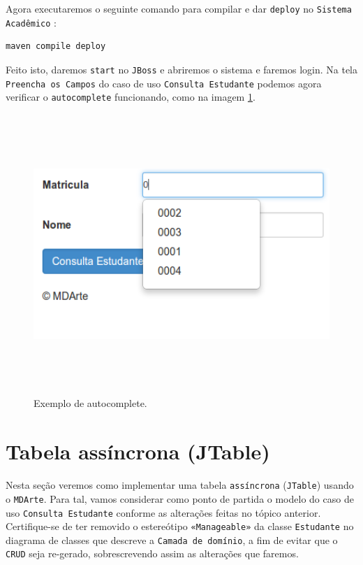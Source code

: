 \begin{framed}

\end{framed}

Agora executaremos o seguinte comando para compilar e dar \texttt{deploy} no
\texttt{Sistema Acadêmico} :
\begin{lstlisting}[language=bash]
maven compile deploy
\end{lstlisting}

Feito isto, daremos \texttt{start} no \texttt{JBoss} e abriremos o sistema e
faremos login. Na tela \texttt{Preencha os Campos} do caso de uso
\texttt{Consulta Estudante} podemos agora verificar o \texttt{autocomplete}
funcionando, como na imagem \ref{exemplo_autocomplete}.
\begin{figure}[H]
	\centering
	\includegraphics[width=350pt,height=300pt]{files/imgs/tutorial-mdarte-0029.png}
	\caption{Exemplo de autocomplete.}
	\label{exemplo_autocomplete}
\end{figure}

\section{Tabela assíncrona (JTable)}
Nesta seção veremos como implementar uma tabela \texttt{assíncrona}
(\texttt{JTable}) usando o \texttt{MDArte}. Para tal, vamos considerar como
ponto de partida o modelo do caso de uso \texttt{Consulta Estudante} conforme as
alterações feitas no tópico anterior. Certifique-se de ter removido o
estereótipo \texttt{«Manageable»} da classe \texttt{Estudante} no diagrama de
classes que descreve a \texttt{Camada de domínio}, a fim de evitar que o
\texttt{CRUD} seja re-gerado, sobrescrevendo assim as alterações que faremos.

